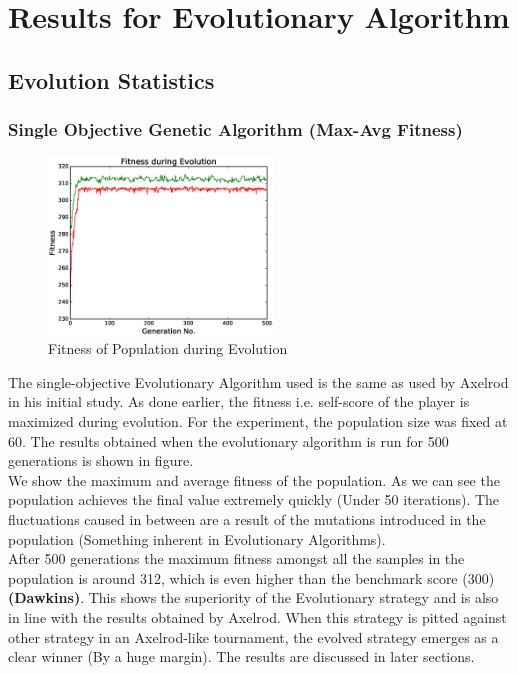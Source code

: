 \documentclass[a4paper]{article}
\begin{document}
	\section{Results for Evolutionary Algorithm}

	\subsection{Evolution Statistics}

	\subsubsection{Single Objective Genetic Algorithm (Max-Avg Fitness)}	

	\begin{figure}
	\centering
	\includegraphics[width=0.53\textwidth]{singFitPlot.eps}
	\caption{\footnotesize{Fitness of Population during Evolution}}
	\end{figure}
	The single-objective Evolutionary Algorithm used is the same as used by Axelrod in his initial study. As done earlier, the fitness i.e. self-score of the player is maximized during evolution. For the experiment, the population size was fixed at 60. The results obtained when the evolutionary algorithm is run for 500 generations is shown in figure.\\
	We show the maximum and average fitness of the population. As we can see the population achieves the final value extremely quickly (Under 50 iterations). The fluctuations caused in between are a result of the mutations introduced in the population (Something inherent in Evolutionary Algorithms).\\
	After 500 generations the maximum fitness amongst all the samples in the population is around 312, which is even higher than the benchmark score (300) \textbf{(Dawkins)}. This shows the superiority of the Evolutionary strategy and is also in line with the results obtained by Axelrod. When this strategy is pitted against other strategy in an Axelrod-like tournament, the evolved strategy emerges as a clear winner (By a huge margin). The results are discussed in later sections.	
\end{document}
